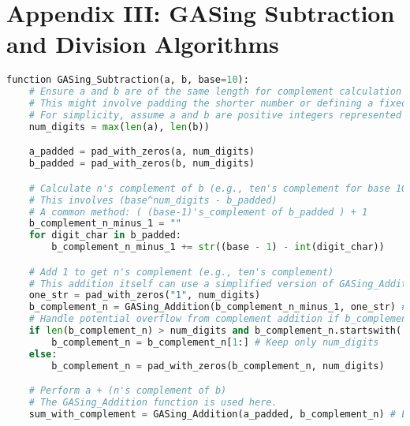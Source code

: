 \section{Appendix III: GASing Subtraction and Division Algorithms}
\label{appendix:subtraction}
\begin{lstlisting}[language=Python,caption={GASing Subtraction Algorithm}]
function GASing_Subtraction(a, b, base=10):
    # Ensure a and b are of the same length for complement calculation
    # This might involve padding the shorter number or defining a fixed width.
    # For simplicity, assume a and b are positive integers represented as strings.
    num_digits = max(len(a), len(b))

    a_padded = pad_with_zeros(a, num_digits)
    b_padded = pad_with_zeros(b, num_digits)

    # Calculate n's complement of b (e.g., ten's complement for base 10)
    # This involves (base^num_digits - b_padded)
    # A common method: ( (base-1)'s_complement of b_padded ) + 1
    b_complement_n_minus_1 = ""
    for digit_char in b_padded:
        b_complement_n_minus_1 += str((base - 1) - int(digit_char))

    # Add 1 to get n's complement (e.g., ten's complement)
    # This addition itself can use a simplified version of GASing_Addition or direct logic
    one_str = pad_with_zeros("1", num_digits)
    b_complement_n = GASing_Addition(b_complement_n_minus_1, one_str) # Assuming base compatibility
    # Handle potential overflow from complement addition if b_complement_n exceeds num_digits
    if len(b_complement_n) > num_digits and b_complement_n.startswith('1'): # Check for leading '1' from carry
        b_complement_n = b_complement_n[1:] # Keep only num_digits
    else:
        b_complement_n = pad_with_zeros(b_complement_n, num_digits)

    # Perform a + (n's complement of b)
    # The GASing_Addition function is used here.
    sum_with_complement = GASing_Addition(a_padded, b_complement_n) # Ensure base compatibility


\end{lstlisting}
